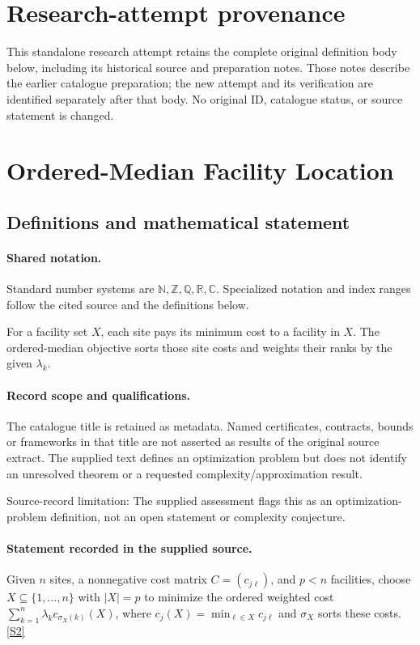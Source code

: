 \documentclass[11pt]{article}
\begin{document}
\section*{Research-attempt provenance}
This standalone research attempt retains the complete original definition body below,
including its historical source and preparation notes. Those notes describe the
earlier catalogue preparation; the new attempt and its verification are identified
separately after that body. No original ID, catalogue status, or source statement is changed.

\section{Ordered-Median Facility Location}\label{statement}

\subsection{Definitions and mathematical statement}

\paragraph{Shared notation.}Standard number systems are $\mathbb N,\mathbb Z,\mathbb Q,\mathbb R,\mathbb C$. Specialized notation and index ranges follow the cited source and the definitions below.


For a facility set $X$, each site pays its minimum cost to a facility in $X$. The ordered-median objective sorts those site costs and weights their ranks by the given $\lambda_k$.
\paragraph{Record scope and qualifications.}
The catalogue title is retained as metadata. Named certificates, contracts, bounds or frameworks in that title are not asserted as results of the original source extract.
The supplied text defines an optimization problem but does not identify an unresolved theorem or a requested complexity/approximation result.

Source-record limitation: The supplied assessment flags this as an optimization-problem definition, not an open statement or complexity conjecture.
\paragraph{Statement recorded in the supplied source.}
Given $n$ sites, a nonnegative cost matrix $C=(c_{j\ell})$, and $p<n$ facilities, choose $X\subseteq\{1,\ldots,n\}$ with $|X|=p$ to minimize the ordered weighted cost $\sum_{k=1}^n\lambda_k c_{\sigma_X(k)}(X)$, where $c_j(X)=\min_{\ell\in X}c_{j\ell}$ and $\sigma_X$ sorts these costs. \href{https://doi.org/10.4171/owr/2017/52}{[S2]}
\end{document}
